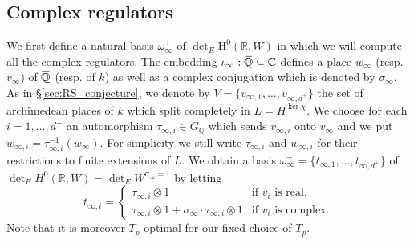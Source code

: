 \documentclass[12pt]{amsart}
\newcommand\bR{\mathbb{R}}
\newcommand\bC{\mathbb{C}}
\newcommand\bQ{\mathbb{Q}}
\newcommand{\ob}[1]{\mkern 1.5mu\overline{\mkern-1.5mu#1\mkern-1.5mu}\mkern 1.5mu}
\newcommand{\HH}{\mathrm{H}}
\theoremstyle{defstyle}
\theoremstyle{thmstyle}
\begin{document}
\subsection{Complex regulators}
We first define a natural basis $\omega_\infty^+$ of $\det_E\HH^0(\bR,W)$ in which we will compute all the complex regulators. The embedding $\iota_\infty:\ob{\bQ}\subseteq \bC$ defines a place $w_\infty$ (resp. $v_\infty$) of $\ob{\bQ}$ (resp. of $k$) as well as a complex conjugation which is denoted by $\sigma_\infty$. As in \S\ref{sec:RS_conjecture}, we denote by $V=\{v_{\infty,1},\ldots,v_{\infty,d^+}\}$ the set of archimedean places of $k$ which split completely in $L=H^{\ker \chi}$. We choose for each $i=1,\ldots,d^+$ an automorphism $\tau_{\infty,i}\in G_{\bQ}$ which sends $v_{\infty,i}$ onto $v_\infty$ and we put $w_{\infty,i}=\tau^{-1}_{\infty,i}(w_\infty)$. For simplicity we still write $\tau_{\infty,i}$ and $w_{\infty,i}$ for their restrictions to finite extensions of $L$. We obtain a basis $\omega_\infty^+=\{t_{\infty,1},\ldots,t_{\infty,d^+}\}$ of $\det_E H^0(\bR,W)=\det_E W^{\sigma_\infty=1}$ by letting 
$$t_{\infty,i}= \left\{\begin{array}{ll}
\tau_{\infty,i}\otimes 1 &  \textrm{if } v_i \textrm{ is real,}\\ 
\tau_{\infty,i}\otimes 1 + \sigma_\infty\cdot\tau_{\infty,i}\otimes 1 &  \textrm{if } v_i \textrm{ is complex.}
\end{array}\right.$$
Note that it is moreover $T_p$-optimal for our fixed choice of $T_p$. 	
\end{document}
